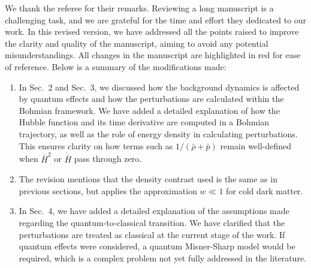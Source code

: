 \documentclass[a4paper,11pt]{article}
\begin{document}
We thank the referee for their remarks. Reviewing a long manuscript is a challenging
task, and we are grateful for the time and effort they dedicated to our work. In this
revised version, we have addressed all the points raised to improve the clarity and
quality of the manuscript, aiming to avoid any potential misunderstandings. All changes
in the manuscript are highlighted in red for ease of reference. Below is a summary of
the modifications made:
\begin{enumerate}
      \item In Sec.~2 and Sec.~3, we discussed how the background dynamics is affected
            by quantum effects and how the perturbations are calculated within the
            Bohmian framework. We have added a detailed explanation of how the Hubble
            function and its time derivative are computed in a Bohmian trajectory, as
            well as the role of energy density in calculating perturbations. This
            ensures clarity on how terms such as $1/(\bar{\rho} + \bar{p})$ remain
            well-defined when $\bar{H}^2$ or $\dot{\bar{H}}$ pass through zero.
      \item The revision mentions that the density contrast used is the same as in
            previous sections, but applies the approximation $w \ll 1$ for cold dark
            matter.
      \item In Sec.~4, we have added a detailed explanation of the assumptions made
            regarding the quantum-to-classical transition. We have clarified that the
            perturbations are treated as classical at the current stage of the work. If
            quantum effects were considered, a quantum Misner-Sharp model would be
            required, which is a complex problem not yet fully addressed in the
            literature.
\end{enumerate}
\end{document}

